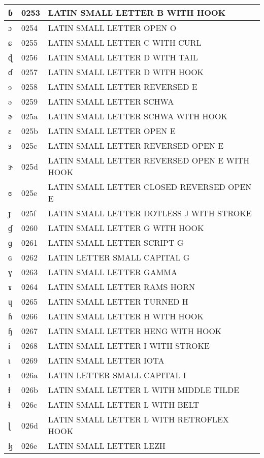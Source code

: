 \documentclass[12pt,letterpaper,openany]{book}
\begin{document}
\begin{center}
\begin{supertabular}{|m{0.25in}|m{0.5in}|m{4in}|}
			ɓ & 0253 & LATIN SMALL LETTER B WITH HOOK\\\hline
			ɔ & 0254 & LATIN SMALL LETTER OPEN O\\\hline
			ɕ & 0255 & LATIN SMALL LETTER C WITH CURL\\\hline
			ɖ & 0256 & LATIN SMALL LETTER D WITH TAIL\\\hline
			ɗ & 0257 & LATIN SMALL LETTER D WITH HOOK\\\hline
			ɘ & 0258 & LATIN SMALL LETTER REVERSED E\\\hline
			ə & 0259 & LATIN SMALL LETTER SCHWA\\\hline
			ɚ & 025a & LATIN SMALL LETTER SCHWA WITH HOOK\\\hline
			ɛ & 025b & LATIN SMALL LETTER OPEN E\\\hline
			ɜ & 025c & LATIN SMALL LETTER REVERSED OPEN E\\\hline
			ɝ & 025d & LATIN SMALL LETTER REVERSED OPEN E WITH HOOK\\\hline
			ɞ & 025e & LATIN SMALL LETTER CLOSED REVERSED OPEN E\\\hline
			ɟ & 025f & LATIN SMALL LETTER DOTLESS J WITH STROKE\\\hline
			ɠ & 0260 & LATIN SMALL LETTER G WITH HOOK\\\hline
			ɡ & 0261 & LATIN SMALL LETTER SCRIPT G\\\hline
			ɢ & 0262 & LATIN LETTER SMALL CAPITAL G\\\hline
			ɣ & 0263 & LATIN SMALL LETTER GAMMA\\\hline
			ɤ & 0264 & LATIN SMALL LETTER RAMS HORN\\\hline
			ɥ & 0265 & LATIN SMALL LETTER TURNED H\\\hline
			ɦ & 0266 & LATIN SMALL LETTER H WITH HOOK\\\hline
			ɧ & 0267 & LATIN SMALL LETTER HENG WITH HOOK\\\hline
			ɨ & 0268 & LATIN SMALL LETTER I WITH STROKE\\\hline
			ɩ & 0269 & LATIN SMALL LETTER IOTA\\\hline
			ɪ & 026a & LATIN LETTER SMALL CAPITAL I\\\hline
			ɫ & 026b & LATIN SMALL LETTER L WITH MIDDLE TILDE\\\hline
			ɬ & 026c & LATIN SMALL LETTER L WITH BELT\\\hline
			ɭ & 026d & LATIN SMALL LETTER L WITH RETROFLEX HOOK\\\hline
			ɮ & 026e & LATIN SMALL LETTER LEZH\\\hline

\end{supertabular}
\end{center}
\end{document}
